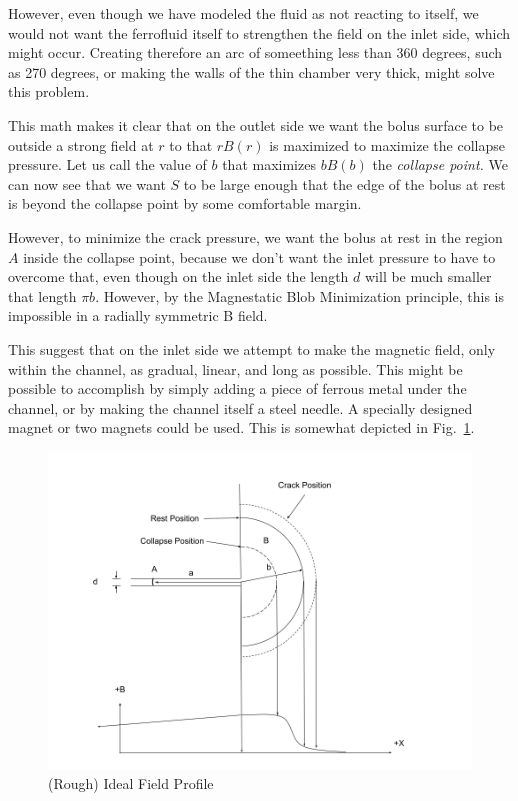 \documentclass[]{asme2ej}
\begin{document}
However, even though we have modeled the fluid as not reacting to itself,
we would not want the ferrofluid itself
to strengthen the field on the inlet side, which might occur. Creating
therefore an arc of someething less than 360 degrees, such as 270 degrees,
or making the walls of the thin chamber very thick, might solve this problem.

This math makes it clear that on the outlet side we want the
bolus surface to be outside a strong field at $r$ to that $r B(r)$ is
maximized to maximize the collapse pressure.
Let us call the value of $b$ that maximizes $b B(b)$ the {\em collapse point.}
We can now see that we want $S$ to be large enough that the edge
of the bolus at rest is beyond the collapse point by some
comfortable margin.

However, to minimize the crack pressure, we want the bolus at rest
in the region $A$ inside
the collapse point, because we don't want the inlet pressure to have
to overcome that, even though on the inlet side the length $d$ will
be much smaller that length $\pi b$. However, by the
Magnestatic Blob Minimization principle, this is impossible in a
radially symmetric B field.

This suggest that on the inlet side we attempt to make
the magnetic field, only within the channel, as gradual, linear, and
long as possible. This might be possible to accomplish by simply adding
a piece of ferrous metal under the channel, or by making the channel
itself a steel needle. A specially designed magnet or two magnets could be
used. This is somewhat depicted in Fig.~\ref{fig:ifp}.

\begin{figure}
\centerline{\includegraphics[width=6in]{figure/IdealFieldProfile.png}}
\caption{(Rough) Ideal Field Profile}
\label{fig:ifp}
\end{figure}
\end{document}
